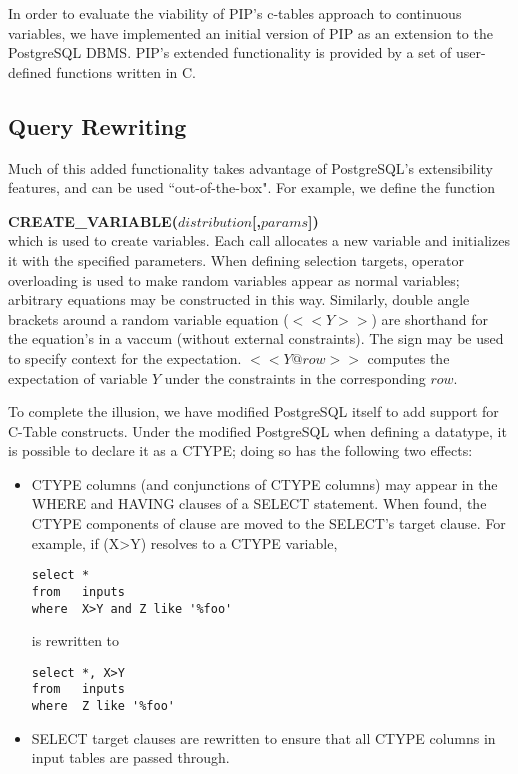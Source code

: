 In order to evaluate the viability of PIP's c-tables approach to continuous variables, we have implemented an initial version of PIP as an extension to the PostgreSQL DBMS.  PIP's extended functionality is provided by a set of user-defined functions written in C.  

\subsection{Query Rewriting}
Much of this added functionality takes advantage of PostgreSQL's extensibility features, and can be used ``out-of-the-box".  For example, we define the function 

\textbf{CREATE\_VARIABLE($distribution$[,$params$])} \\
which is used to create variables.  Each call allocates a new variable and initializes it with the specified parameters.  When defining selection targets, operator overloading is used to make random variables appear as normal variables; arbitrary equations may be constructed in this way.  Similarly, double angle brackets around a random variable equation ($<< Y >>$) are shorthand for the equation's in a vaccum (without external constraints).  The \@ sign may be used to specify context for the expectation.  $<< Y @ row >>$ computes the expectation of variable $Y$ under the constraints in the corresponding $row$.


To complete the illusion, we have modified PostgreSQL itself to add support for C-Table constructs.  Under the modified PostgreSQL when defining a datatype, it is possible to declare it as a CTYPE; doing so has the following two effects:
\begin{itemize}
\item CTYPE columns (and conjunctions of CTYPE columns) may appear in the WHERE and HAVING clauses of a SELECT statement.  When found, the CTYPE components of clause are moved to the SELECT's target clause.  For example, if (X>Y) resolves to a CTYPE variable, 
\begin{verbatim}
select *
from   inputs
where  X>Y and Z like '%foo'
\end{verbatim}
is rewritten to
\begin{verbatim}
select *, X>Y
from   inputs
where  Z like '%foo'
\end{verbatim}

\item SELECT target clauses are rewritten to ensure that all CTYPE columns in input tables are passed through.
\end{itemize}

